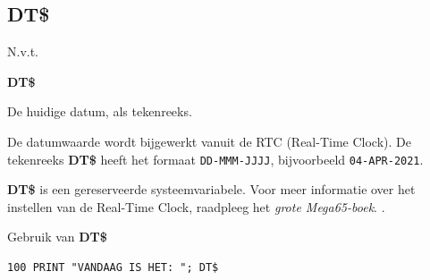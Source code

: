 
\newpage
\subsection{DT\$}
\begin{description}[leftmargin=2cm,style=nextline]
\item [Token:]    N.v.t.

\item [Formaat:]   {\bf DT\$}

\item [Gebruik:]    De huidige datum, als tekenreeks.

                  De datumwaarde wordt bijgewerkt vanuit de RTC (Real-Time Clock). De tekenreeks {\bf DT\$} heeft het formaat \texttt{DD-MMM-JJJJ}, bijvoorbeeld \texttt{04-APR-2021}.

\item[Opmerkingen:]   {\bf DT\$} is een gereserveerde systeemvariabele. Voor meer informatie over het instellen van de Real-Time Clock, raadpleeg \ifdefined\printmanual                     het {\em grote Mega65-boek}.
                  \else
                     .
                  \fi

\item [Voorbeeld:]  Gebruik van {\bf DT\$}

\begin{tcolorbox}[colback=black,coltext=white]
\verbatimfont{\codefont}
\begin{verbatim}
100 PRINT "VANDAAG IS HET: "; DT$
\end{verbatim}
\end{tcolorbox}
\end{description}


\newpage
